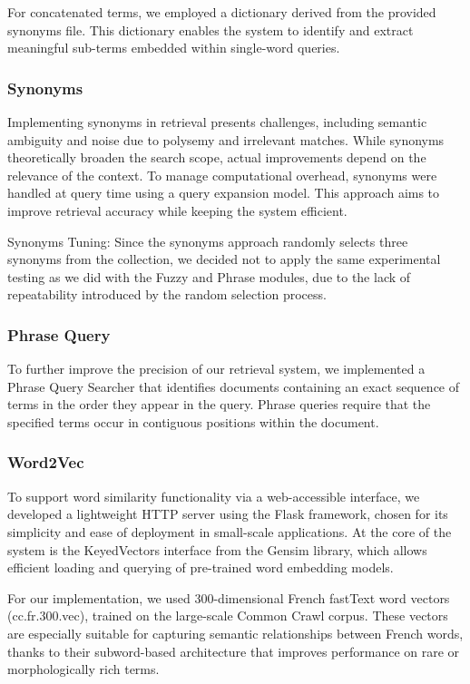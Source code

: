 For concatenated terms, we employed a dictionary derived from the provided synonyms file. This dictionary enables the system to identify and extract meaningful sub-terms embedded within single-word queries.

\subsubsection{Synonyms}
\label{subsubsec:synonyms}
Implementing synonyms in retrieval presents challenges, including semantic ambiguity and noise due to polysemy and irrelevant matches. While synonyms theoretically broaden the search scope, actual improvements depend on the relevance of the context. To manage computational overhead, synonyms were handled at query time using a query expansion model. This approach aims to improve retrieval accuracy while keeping the system efficient.

Synonyms Tuning: Since the synonyms approach randomly selects three synonyms from the collection, we decided not to apply the same experimental testing as we did with the Fuzzy and Phrase modules, due to the lack of repeatability introduced by the random selection process.

\subsubsection{Phrase Query}
\label{subsubsec:Phrase-Query}
To further improve the precision of our retrieval system, we implemented a Phrase Query Searcher that identifies documents containing an exact sequence of terms in the order they appear in the query. Phrase queries require that the specified terms occur in contiguous positions within the document.

\subsubsection{Word2Vec}
\label{subsubsec:Word2Vec}
To support word similarity functionality via a web-accessible interface, we developed a lightweight HTTP server using the Flask framework, chosen for its simplicity and ease of deployment in small-scale applications. At the core of the system is the KeyedVectors interface from the Gensim library, which allows efficient loading and querying of pre-trained word embedding models.

For our implementation, we used 300-dimensional French fastText word vectors (cc.fr.300.vec), trained on the large-scale Common Crawl corpus. These vectors are especially suitable for capturing semantic relationships between French words, thanks to their subword-based architecture that improves performance on rare or morphologically rich terms.


